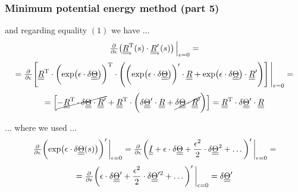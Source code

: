 \begin{frame}
  \frametitle{Minimum potential energy method (part 5)}
  
  and regarding equality $(1)$ we have ...
  \begin{displaymath}
    \pd{}{\epsilon} \bigl( \doubleunderline{R}_{\epsilon}^{\mathrm{T}}(s) \cdot \doubleunderline{R}_{\epsilon}^{\prime}(s) \bigr) \sVert[2]_{\epsilon=0} =
  \end{displaymath}
  \begin{displaymath}
    = \pd{}{\epsilon} \Biggl[
      \doubleunderline{R}^{\mathrm{T}} \cdot \biggl( \exp \bigl( \epsilon \cdot \delta \doubleunderline{\Theta} \bigr) \biggr)^{\mathrm{T}}
      \cdot \Biggl(
        \biggl( \exp \bigl( \epsilon \cdot \delta \doubleunderline{\Theta} \bigr) \biggr)^{\prime} \cdot \doubleunderline{R}
        + \exp \bigl( \epsilon \cdot \delta \doubleunderline{\Theta} \bigr) \cdot \doubleunderline{R}^{\prime}
      \Biggr)
    \Biggr] \sVert[4]_{\epsilon=0} =
  \end{displaymath}
  \begin{displaymath}
    = \Bigl[
      \cancel{-\underline{\underline{R}}^{\mathrm{T}} \cdot \delta \underline{\underline{\Theta}} \cdot \underline{\underline{R}}^{\prime}} +
        \underline{\underline{R}}^{\mathrm{T}} \cdot
        \biggl(
          \delta \underline{\underline{\Theta}}^{\prime} \cdot \underline{\underline{R}} +
          \cancel{ \delta \underline{\underline{\Theta}} \cdot \underline{\underline{R}}^{\prime} } 
        \biggr)
      \Bigr] =
      \underline{\underline{R}}^{\mathrm{T}} \cdot
      \delta \underline{\underline{\Theta}}^{\prime} \cdot \underline{\underline{R}}
  \end{displaymath}
  
  \vspace{0.5em}
  ... where we used ...
  \begin{displaymath}
    \pd{}{\epsilon} \biggl( \exp \bigl( \epsilon \cdot \delta \doubleunderline{\Theta}(s) \bigr) \biggr)^{\prime} \sVert[3]_{\epsilon=0} =
    \pd{}{\epsilon} \biggl( \doubleunderline{I} + \epsilon \cdot \delta \doubleunderline{\Theta} + \frac{\epsilon^2}{2} \cdot \delta \doubleunderline{\Theta}^2 + \dots \biggr)^{\prime} \sVert[3]_{\epsilon=0} =
  \end{displaymath}
  \begin{displaymath}
    = \pd{}{\epsilon} \biggl( \epsilon \cdot \delta \doubleunderline{\Theta}^{\prime} + \frac{\epsilon^2}{2} \cdot \delta \doubleunderline{\Theta}^{\prime 2} + \dots \biggr)^{\prime} \sVert[3]_{\epsilon=0} =
    \delta \doubleunderline{\Theta}^{\prime} 
  \end{displaymath}
\end{frame}


